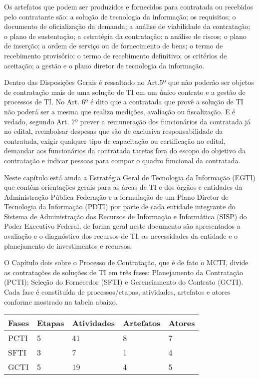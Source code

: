 Os artefatos que podem ser produzidos e fornecidos para contratada ou recebidos pelo contratante são: a solução de tecnologia da informação; os requisitos; o documento de oficialização da demanda; a análise de viabilidade da contratação; o plano de sustentação; a estratégia da contratação; a análise de riscos; o plano de inserção; a ordem de serviço ou de fornecimento de bens; o termo de recebimento provisório; o termo de recebimento definitivo; os critérios de aceitação; a gestão e o plano diretor de tecnologia da informação.

Dentro das Disposições Gerais é ressaltado no Art.5º que não poderão ser objetos de contratação mais de uma solução de TI em um único contrato e a gestão de processos de TI.  No Art. 6º é dito que a contratada que provê a solução de TI não poderá ser a mesma que realiza medições, avaliação ou fiscalização. E é vedado, segundo Art. 7º prever a remuneração dos funcionários da contratada já no edital, reembolsar despesas que são de exclusiva responsabilidade da contratada, exigir qualquer tipo de capacitação ou certificação no edital, demandar aos funcionários da contratada tarefas fora do escopo do objetivo da contratação  e indicar pessoas para compor o quadro funcional da contratada. 

Neste capítulo está ainda a Estratégia Geral de Tecnologia da Informação (EGTI) que contém orientações gerais para as áreas de TI e dos órgãos e entidades da Administração Pública Federação e a formulação de um Plano Diretor de Tecnologia da Informação (PDTI) por parte de cada entidade integrante do Sistema de Administração dos Recursos de Informação e Informática (SISP) do Poder Executivo Federal, de forma geral neste documento são apresentados a avaliação e o diagnóstico dos recursos de TI, as necessidades da entidade e o planejamento de investimentos e recursos.

O Capítulo dois sobre o Processo de Contratação, que é de fato o MCTI, divide as contratações de soluções de TI em três fases: Planejamento da Contratação (PCTI); Seleção do Fornecedor (SFTI) e Gerenciamento do Contrato (GCTI). Cada fase é constituída de processos/etapas, atividades, artefatos e atores conforme mostrado na tabela abaixo.
  
\begin{table}[htb]
\center
\footnotesize
\begin{tabular}{|p{1.4cm}|p{1cm}|p{3cm}|p{3cm}|p{3cm}|}
  \hline
   \textbf{Fases} & \textbf{Etapas}  & \textbf{Atividades}  & \textbf{Artefatos} & \textbf{Atores}  \\
    \hline
    PCTI & 5 & 41 & 8 & 7\\
   \hline    
    SFTI & 3 & 7 & 1 & 4\\
    \hline
    GCTI & 5 & 19 & 4 & 5\\
   \hline
\end{tabular}
\end{table}


